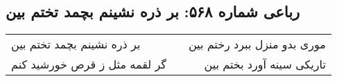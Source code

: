 \begin{center}
\section*{رباعی شماره ۵۶۸: بر ذره نشینم بچمد تختم بین}
\label{sec:sh568}
\begin{longtable}{l p{0.5cm} r}
بر ذره نشینم بچمد تختم بین
&&
موری بدو منزل ببرد رختم بین
\\
گر لقمه مثل ز قرص خورشید کنم
&&
تاریکی سینه آورد بختم بین
\\
\end{longtable}
\end{center}
